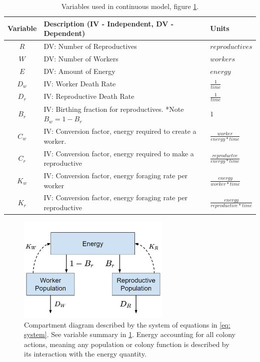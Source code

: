 \documentclass[12pt]{report}
\begin{document}
\begin{table}
\begin{tabular}{|| c p{9cm} l |}
\hline
 

 Variable & Description (IV - Independent, DV - Dependent) & Units  \\ [0.5ex] 
 \hline\hline
 $R$  & DV: Number of Reproductives 			& $reproductives$ \\  [5pt]
 $W$ & DV: Number of Workers    					& $workers$ \\ [5pt]
 $E$  & DV: Amount of Energy 							& $energy$ \\  [5pt]
 $D_w$& IV: Worker Death Rate 							& $\frac{1}{time}$  \\   [5pt]
 $D_r$ & IV: Reproductive Death Rate 				& $\frac{1}{time}$   \\  [5pt]
 $B_r$ & IV: Birthing fraction for reproductives.  *Note $B_w = 1-B_r$  & $1$  \\  [5pt]
 $C_w$& IV: Conversion factor, energy required to create a worker. & $\frac{worker}{energy * time}$ \\  [5pt]
 $C_r$ & IV: Conversion factor, energy required to make a reproductive & $\frac{reproductve}{energy * time}$ \\ 
 $K_w$& IV: Conversion factor, energy foraging rate per worker & $\frac{energy}{worker * time}$ \\  [5pt]
 $K_r$ & IV: Conversion factor, energy foraging rate per reproductive & $\frac{energy}{reproductive * time}$ \\  [5pt] \hline
\end{tabular}
\label{table: variables}
\caption{Variables used in continuous model, figure \ref{fig: Compartment Diagram}.}
\end{table}


\begin{figure}
	\centering
    \includegraphics[width=0.65\textwidth]{compartmentdiagram.png}
    \caption{Compartment diagram described by the system of equations in \ref{eq: system}.  See variable summary in \ref{table: variables}. Energy accounting for all colony actions, meaning any population or colony function is described by its interaction with the energy quantity. }
    \label{fig: Compartment Diagram}
\end{figure}
\end{document}
